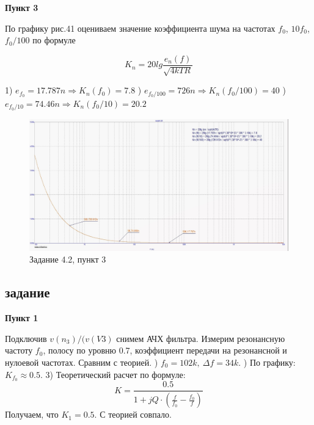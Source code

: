 \documentclass[a4paper, 14pt]{extarticle}%
\begin{document}
\textbf{Пункт 3}
\newline


По графику рис.41 оцениваем значение коэффициента шума на частотах $f_0$, $10f_0$, $f_0/100$ по формуле
\newline

\[  K_n = 20lg\frac{e_n(f)}{\sqrt{4kTR}}   \]


1) $e_{f_0}= 17.787n \Rightarrow K_n(f_0) = 7.8 $
) $e_{f_0/100}= 726n \Rightarrow K_n(f_0/100) = 40 $
) $e_{f_0/10}= 74.46n \Rightarrow K_n(f_0/10) = 20.2 $
\newline

\begin{figure}[h!]
			\centering
			\includegraphics[width=1.1\linewidth]{4/4_2_1.jpg}
			\caption{Задание 4.2, пункт 3}
			\label{A}
\end{figure}



\subsection{задание}

\textbf{Пункт 1}
\newline

Подключив $v(n_3)/(v(V3)$ снимем АЧХ фильтра. Измерим резонансную частоту $f_0$, полосу по уровню 0.7, коэффициент передачи на резонансной и нулоевой частотах. 
\newline
Сравним с теорией.
) $f_0 = 102k, \: \Delta f = 34k$.
) По графику:$K_{f_0} \approx 0.5$.
3) Теоретический расчет по формуле:
\newline
\[ K = \frac{0.5}{1 + jQ\cdot(\frac{f}{f_0} - \frac{f_0}{f})}\]
\newline
Получаем, что $K_1 = 0.5$.
\newline
С теорией совпало.
\end{document}
